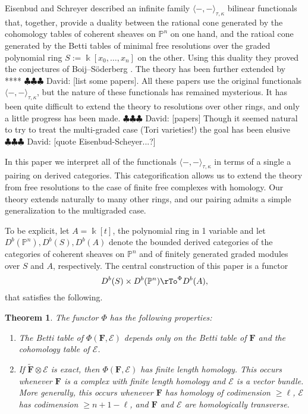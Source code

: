 \documentclass[12pt]{amsart}
\newtheorem{theorem}[lemma]{Theorem}
\theoremstyle{definition}
\theoremstyle{remark}
\newcommand{\kk}{\Bbbk}
\newcommand{\PP}{\mathbb{P}}
\newcommand{\cE}{\mathcal{E}}
\newcommand{\FF}{\mathbf{F}}
\newcommand{\david}[1]{{\color{red} \sf $\clubsuit\clubsuit\clubsuit$ David: [#1]}}
\renewcommand{\P}{{\mathbb P}}
\begin{document}
Eisenbud and Schreyer \cite{eis-schrey1} described an infinite family $\langle -,-\rangle_{\tau,\kappa}$ bilinear functionals that, together, provide a duality between the rational cone generated by the cohomology tables of coherent sheaves on $\PP^n$ on one hand,  and the ratioal cone generated by the Betti tables of minimal free resolutions over the graded polynomial ring $S:=\kk[x_0, \dots, x_n]$ on the other. Using this duality they proved the conjectures of Boij--S\"oderberg \cite{}. The theory has been further extended by ****\david{list some papers}. All these papers use the original functionals $\langle -,-\rangle_{\tau,\kappa}$, but the nature of these functionals has remained mysterious. It has been quite difficult to extend the theory to resolutions over other rings, and only a little progress has been made. \david{papers} Though it seemed natural to try to treat the multi-graded case (Tori varieties!) the goal has been elusive \david{quote Eisenbud-Scheyer...?}

In this paper we interpret all of the functionals $\langle-,-\rangle_{\tau,\kappa}$ in terms of a single a pairing on derived categories. This categorification allows us to extend the theory from free resolutions to the case of finite free complexes with homology. Our theory extends naturally to many other rings, and our pairing admits a simple generalization to the multigraded case.

To be explicit, let $A = \kk[t]$, the polynomial ring in 1 variable and let $D^{b}(\P^{n}), D^{b}(S), D^{b}(A)$ denote the bounded derived categories of the categories of coherent sheaves on $\P^{n}$ and of finitely generated graded modules over $S$ and $A$, respectively.  The central construction of this paper is a functor
$$
D^{b}(S)\times D^{b}(\P^{n})  \rTo^{\Phi} D^{b}(A),
$$
that satisfies the following.
\begin{theorem}\label{thm:Phi}
The functor $\Phi$ has the following  properties:
\begin{enumerate}
	\item\label{thm:Phi:1}  The Betti table of $\Phi(\FF,\cE)$ depends only on the Betti table of $\FF$ and the cohomology table of $\cE$.
	\item\label{thm:Phi:2}  If $\widetilde{\FF}\otimes \cE$ is exact, then $\Phi(\FF,\cE)$ has finite length homology.  This occurs whenever $\FF$ is a complex with finite length homology and $\cE$ is a vector bundle.  More generally, this occurs  whenever  $\FF$ has homology of codimension $\geq \ell$,  $\cE$ has codimension $\geq n+1-\ell$, and $\FF$ and $\cE$ are homologically transverse.
\end{enumerate}
\end{theorem}
\end{document}
